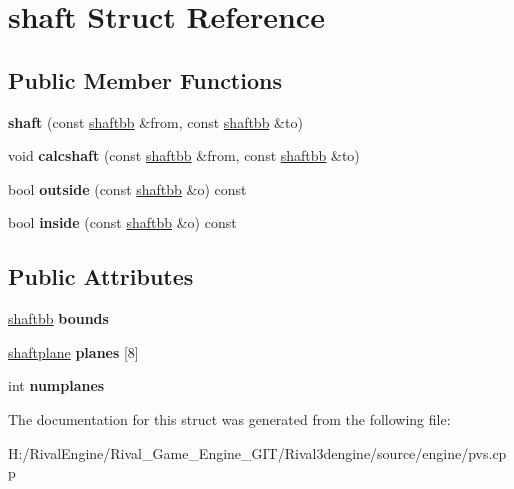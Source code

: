 \hypertarget{structshaft}{}\section{shaft Struct Reference}
\label{structshaft}
\subsection*{Public Member Functions}
\begin{DoxyCompactItemize}
\item 
\mbox{\label{structshaft_acda767b9024df1921a8f20b9412cc913}} 
{\bfseries shaft} (const \hyperlink{structshaftbb}{shaftbb} \&from, const \hyperlink{structshaftbb}{shaftbb} \&to)
\item 
\mbox{\label{structshaft_a7331d0113a9fb49c85fb44748f8c4f52}} 
void {\bfseries calcshaft} (const \hyperlink{structshaftbb}{shaftbb} \&from, const \hyperlink{structshaftbb}{shaftbb} \&to)
\item 
\mbox{\label{structshaft_a7ee15449aacd144e542bd4583197c3ac}} 
bool {\bfseries outside} (const \hyperlink{structshaftbb}{shaftbb} \&o) const
\item 
\mbox{\label{structshaft_a7962c077b23e1a50fd938bb9362422bb}} 
bool {\bfseries inside} (const \hyperlink{structshaftbb}{shaftbb} \&o) const
\end{DoxyCompactItemize}
\subsection*{Public Attributes}
\begin{DoxyCompactItemize}
\item 
\mbox{\label{structshaft_ac0c43b2fba68753a23eca4635a6d42cb}} 
\hyperlink{structshaftbb}{shaftbb} {\bfseries bounds}
\item 
\mbox{\label{structshaft_aba96d719518a53a0d312d1891bb3141a}} 
\hyperlink{structshaftplane}{shaftplane} {\bfseries planes} \mbox{[}8\mbox{]}
\item 
\mbox{\label{structshaft_adc2d47c5a45d7d621971a15857edcc33}} 
int {\bfseries numplanes}
\end{DoxyCompactItemize}


The documentation for this struct was generated from the following file\+:\begin{DoxyCompactItemize}
\item 
H\+:/\+Rival\+Engine/\+Rival\+\_\+\+Game\+\_\+\+Engine\+\_\+\+G\+I\+T/\+Rival3dengine/source/engine/pvs.\+cpp\end{DoxyCompactItemize}
